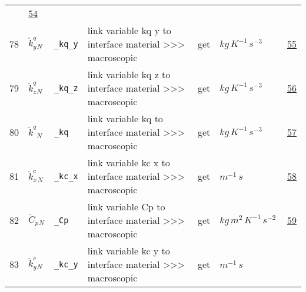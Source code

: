 \begin{longtable}{|p{1cm}|p{2.5cm}|p{4.5cm}|p{8cm}|p{3.0cm}|p{3cm}|p{1cm}|}
             & \hyperlink{"e:54"}{ 54 }
                 \\
    78
             & \hypertarget{"v:78"}{ $ {{\mathring k^q_y}}{_{N}} $}
             & \verb|_kq_y|
             & link variable kq y to interface material >>> macroscopic
             & \begin{lay}get \end{lay}
             & $ kg \,K^{-1} \,s^{-3} \, $
             & \hyperlink{"e:55"}{ 55 }
                 \\
    79
             & \hypertarget{"v:79"}{ $ {{\mathring k^q_z}}{_{N}} $}
             & \verb|_kq_z|
             & link variable kq z to interface material >>> macroscopic
             & \begin{lay}get \end{lay}
             & $ kg \,K^{-1} \,s^{-3} \, $
             & \hyperlink{"e:56"}{ 56 }
                 \\
    80
             & \hypertarget{"v:80"}{ $ {{\mathring k^q}}{_{N}} $}
             & \verb|_kq|
             & link variable kq to interface material >>> macroscopic
             & \begin{lay}get \end{lay}
             & $ kg \,K^{-1} \,s^{-3} \, $
             & \hyperlink{"e:57"}{ 57 }
                 \\
    81
             & \hypertarget{"v:81"}{ $ {{\mathring k^c_x}}{_{N}} $}
             & \verb|_kc_x|
             & link variable kc x to interface material >>> macroscopic
             & \begin{lay}get \end{lay}
             & $ m^{-1} \,s \, $
             & \hyperlink{"e:58"}{ 58 }
                 \\
    82
             & \hypertarget{"v:82"}{ $ {{\mathring C_p}}{_{N}} $}
             & \verb|_Cp|
             & link variable Cp to interface material >>> macroscopic
             & \begin{lay}get \end{lay}
             & $ kg \,m^{2} \,K^{-1} \,s^{-2} \, $
             & \hyperlink{"e:59"}{ 59 }
                 \\
    83
             & \hypertarget{"v:83"}{ $ {{\mathring k^c_y}}{_{N}} $}
             & \verb|_kc_y|
             & link variable kc y to interface material >>> macroscopic
             & \begin{lay}get \end{lay}
             & $ m^{-1} \,s \, $

\end{longtable}
